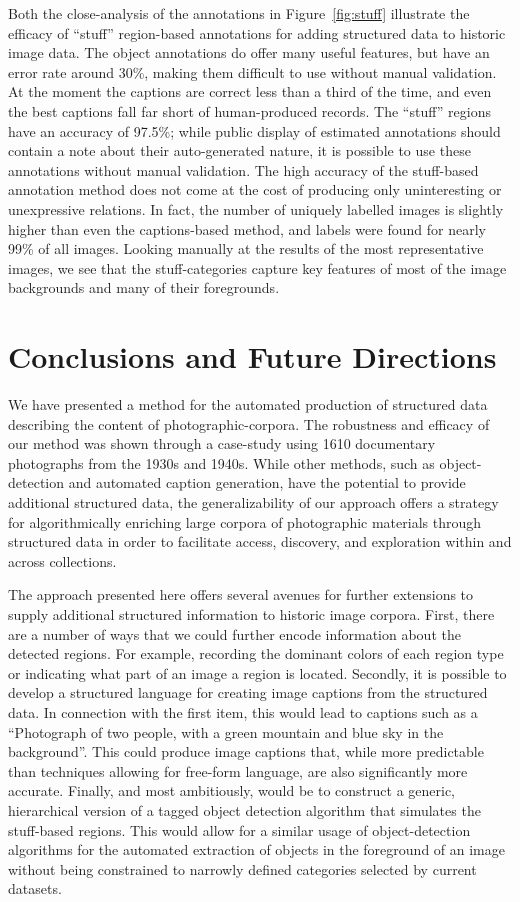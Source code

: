 \documentclass[10pt, a4paper]{article}
\begin{document}
Both the close-analysis of the annotations in Figure~\ref{fig:stuff} illustrate
the efficacy of ``stuff'' region-based annotations for adding structured data to
historic image data. The object annotations do offer many useful features, but
have an error rate around 30\%, making them difficult to use without manual
validation. At the moment the captions are correct less than a third of the
time, and even the best captions fall far short of human-produced records. The
``stuff'' regions have an accuracy of 97.5\%; while public display of estimated
annotations should contain a note about their auto-generated nature, it is
possible to use these annotations without manual validation. The high accuracy
of the stuff-based annotation method does not come at the cost of producing only
uninteresting or unexpressive relations. In fact, the number of uniquely labelled
images is slightly higher than even the captions-based method, and labels were
found for nearly 99\% of all images. Looking manually at the results of the
most representative images, we see that the stuff-categories capture key
features of most of the image backgrounds and many of their foregrounds.

\section{Conclusions and Future Directions} \label{sec:conclude}

We have presented a method for the automated production of structured
data describing the content of photographic-corpora. The robustness and efficacy
of our method was shown through a case-study using 1610 documentary
photographs from the 1930s and 1940s. While other methods, such as
object-detection and automated caption generation, have the potential to provide
additional structured data, the generalizability of our approach offers a
strategy for algorithmically enriching large corpora of photographic materials
through structured data in order to facilitate access, discovery, and
exploration within and across collections.

The approach presented here offers several avenues for further extensions to
supply additional structured information to historic image corpora. First, there
are a number of ways that we could further encode information about the detected
regions. For example, recording the dominant colors of each region type or
indicating what part of an image a region is located. Secondly, it is possible
to develop a structured language for creating image captions from the structured
data. In connection with the first item, this would lead to captions such as a
``Photograph of two people, with a green mountain and blue sky in the
background''. This could produce image captions that, while more predictable
than techniques allowing for free-form language, are also significantly more
accurate. Finally, and most ambitiously, would be to construct a generic,
hierarchical version of a tagged object detection algorithm that simulates
the stuff-based regions. This would allow for a similar usage of
object-detection algorithms for the automated extraction of objects in the
foreground of an image without being constrained to narrowly defined categories
selected by current datasets.
\end{document}
